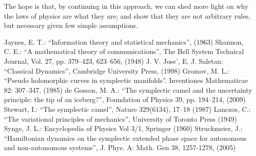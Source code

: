 \documentclass[aps,pra,10pt,twocolumn,floatfix,nofootinbib]{revtex4-1}
\theoremstyle{definition}
\begin{document}
The hope is that, by continuing in this approach, we can shed more light on why the laws of physics are what they are; and show that they are not arbitrary rules, but necessary given few simple assumptions.

\begin{thebibliography}{0}

 Jaynes, E. T.: ``Information theory and statistical mechanics'', (1963)
 Shannon, C. E.: ``A mathematical theory of communications'', The Bell System Technical Journal, Vol. 27, pp. 379–423, 623–656, (1948)
 J. V. Jose', E. J. Saletan: ``Classical Dynamics'', Cambridge University Press, (1998)
 Gromov, M. L.: ``Pseudo holomorphic curves in symplectic manifolds''. Inventiones Mathematicae 82: 307–347, (1985)
 de Gosson, M. A.: ``The symplectic camel and the uncertainty principle: the tip of an iceberg?'', Foundation of Physics 39, pp. 194–214, (2009)
 Stewart, I.: ``The symplectic camel'', Nature 329(6134), 17–18 (1987)
 Lanczos, C.: ``The variational principles of mechanics'', University of Toronto Press (1949)
 Synge, J. L.: Encyclopedia of Physics Vol 3/1, Springer (1960)
 Struckmeier, J.: ``Hamiltonian dynamics on the symplectic extended phase space for autonomous and non-autonomous systems'', J. Phys. A: Math. Gen 38, 1257-1278, (2005)

\end{thebibliography}
\end{document}
